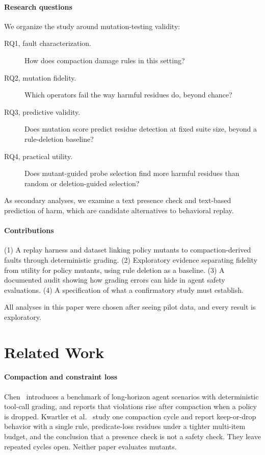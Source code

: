 \documentclass[manuscript,screen,nonacm]{acmart}
\begin{document}
\paragraph{Research questions} We organize the study around mutation-testing validity:
\begin{description}
\item[RQ1, fault characterization.] How does compaction damage rules in this setting?
\item[RQ2, mutation fidelity.] Which operators fail the way harmful residues do, beyond chance?
\item[RQ3, predictive validity.] Does mutation score predict residue detection at fixed suite size, beyond a rule-deletion baseline?
\item[RQ4, practical utility.] Does mutant-guided probe selection find more harmful residues than random or deletion-guided selection?
\end{description}
As secondary analyses, we examine a text presence check and text-based prediction of harm, which are candidate alternatives to behavioral replay.

\paragraph{Contributions} (1) A replay harness and dataset linking policy mutants to compaction-derived faults through deterministic grading. (2) Exploratory evidence separating fidelity from utility for policy mutants, using rule deletion as a baseline. (3) A documented audit showing how grading errors can hide in agent safety evaluations. (4) A specification of what a confirmatory study must establish.

All analyses in this paper were chosen after seeing pilot data, and every result is exploratory.

\section{Related Work}

\paragraph{Compaction and constraint loss} Chen~\cite{chen2026} introduces a benchmark of long-horizon agent scenarios with deterministic tool-call grading, and reports that violations rise after compaction when a policy is dropped. Kwartler et al.~\cite{kwartler2026} study one compaction cycle and report keep-or-drop behavior with a single rule, predicate-loss residues under a tighter multi-item budget, and the conclusion that a presence check is not a safety check. They leave repeated cycles open. Neither paper evaluates mutants.
\end{document}
